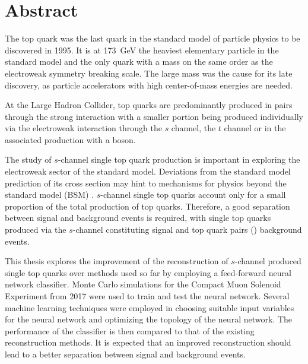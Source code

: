 \chapter*{Abstract}

The top quark was the last quark in the standard model of particle physics to be discovered in 1995. It is at \SI{173}{GeV} the heaviest elementary particle in the standard model and the only quark with a mass on the same order as the electroweak symmetry breaking scale. The large mass was the cause for its late discovery, as particle accelerators with high center-of-mass energies are needed.

At the Large Hadron Collider, top quarks are predominantly produced in pairs through the strong interaction with a smaller portion being produced individually via the electroweak interaction through the $s$ channel, the $t$ channel or in the associated production with a \PW boson.

The study of $s$-channel single top quark production is important in exploring the electroweak sector of the standard model. Deviations from the standard model prediction of its cross section may hint to mechanisms for physics beyond the standard model (BSM) \cite{CMS16}. $s$-channel single top quarks account only for a small proportion of the total production of top quarks. Therefore, a good separation between signal and background events is required, with single top quarks produced via the $s$-channel constituting signal and top quark pairs (\PtopNOSPACE\APtop) background events. 

This thesis explores the improvement of the reconstruction of $s$-channel produced single top quarks over methods used so far by employing a feed-forward neural network classifier. Monte Carlo simulations for the Compact Muon Solenoid Experiment from 2017 were used to train and test the neural network. Several machine learning techniques were employed in choosing suitable input variables for the neural network and optimizing the topology of the neural network. The performance of the classifier is then compared to that of the existing reconstruction methods. It is expected that an improved reconstruction should lead to a better separation between signal and background events.